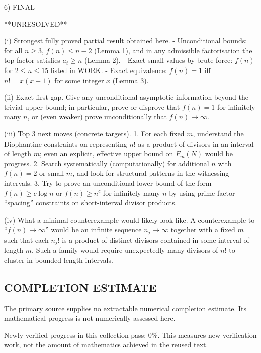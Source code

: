 6) FINAL

**UNRESOLVED**

(i) Strongest fully proved partial result obtained here.
- Unconditional bounds: for all $n\ge 3$, $f(n)\le n-2$ (Lemma 1), and in any admissible factorisation the top factor satisfies $a_t\ge n$ (Lemma 2).
- Exact small values by brute force: $f(n)$ for $2\le n\le 15$ listed in WORK.
- Exact equivalence: $f(n)=1$ iff $n!=x(x+1)$ for some integer $x$ (Lemma 3).

(ii) Exact first gap.
Give any unconditional asymptotic information beyond the trivial upper bound; in particular, prove or disprove that $f(n)=1$ for infinitely many $n$, or (even weaker) prove unconditionally that $f(n)\to\infty$.

(iii) Top 3 next moves (concrete targets).
1. For each fixed $m$, understand the Diophantine constraints on representing $n!$ as a product of divisors in an interval of length $m$; even an explicit, effective upper bound on $F_m(N)$ would be progress.
2. Search systematically (computationally) for additional $n$ with $f(n)=2$ or small $m$, and look for structural patterns in the witnessing intervals.
3. Try to prove an unconditional lower bound of the form $f(n)\ge c\log n$ or $f(n)\ge n^{c}$ for infinitely many $n$ by using prime-factor “spacing” constraints on short-interval divisor products.

(iv) What a minimal counterexample would likely look like.
A counterexample to “$f(n)\to\infty$” would be an infinite sequence $n_j\to\infty$ together with a fixed $m$ such that each $n_j!$ is a product of distinct divisors contained in some interval of length $m$. Such a family would require unexpectedly many divisors of $n!$ to cluster in bounded-length intervals.




\subsection*{COMPLETION ESTIMATE}
The primary source supplies no extractable numerical completion estimate. Its mathematical progress is not numerically assessed here.

Newly verified progress in this collection pass: $0\%$. This measures new verification work, not the amount of mathematics achieved in the reused text.
